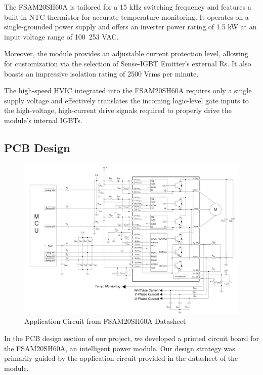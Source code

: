 The FSAM20SH60A is tailored for a 15 kHz switching frequency and features a built-in NTC thermistor for accurate temperature monitoring. It operates on a single-grounded power supply and offers an inverter power rating of 1.5 kW at an input voltage range of 100~253 VAC. 

Moreover, the module provides an adjustable current protection level, allowing for customization via the selection of Sense-IGBT Emitter's external Rs. It also boasts an impressive isolation rating of 2500 Vrms per minute. 

The high-speed HVIC integrated into the FSAM20SH60A requires only a single supply voltage and effectively translates the incoming logic-level gate inputs to the high-voltage, high-current drive signals required to properly drive the module's internal IGBTs. 



\subsection{PCB Design}

\begin{figure}[H]
	\includegraphics[width=6in]{sections/section4/images/PCBDesign/ApplicationCircuitfromDatasheet.png}
	\caption{Application Circuit from FSAM20SH60A Datasheet}
\end{figure}

In the PCB design section of our project, we developed a printed circuit board for the FSAM20SH60A, an intelligent power module. Our design strategy was primarily guided by the application circuit provided in the datasheet of the module. 

